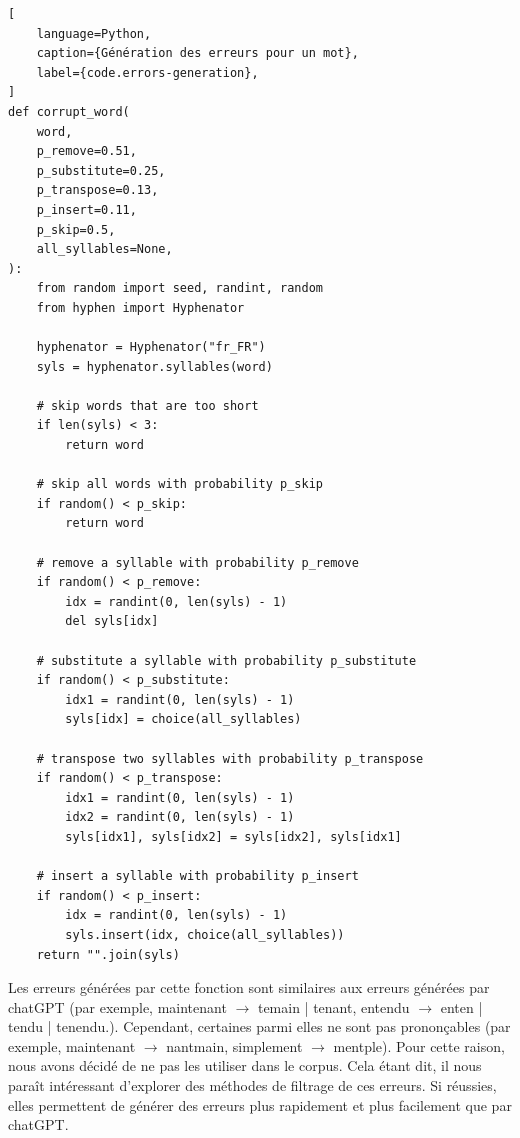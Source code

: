 \begin{lstlisting}[
    language=Python,
    caption={Génération des erreurs pour un mot},
    label={code.errors-generation},
]
def corrupt_word(
    word,
    p_remove=0.51,
    p_substitute=0.25,
    p_transpose=0.13,
    p_insert=0.11,
    p_skip=0.5,
    all_syllables=None,
):
    from random import seed, randint, random
    from hyphen import Hyphenator

    hyphenator = Hyphenator("fr_FR")
    syls = hyphenator.syllables(word)

    # skip words that are too short
    if len(syls) < 3:
        return word

    # skip all words with probability p_skip
    if random() < p_skip:
        return word

    # remove a syllable with probability p_remove
    if random() < p_remove:
        idx = randint(0, len(syls) - 1)
        del syls[idx]

    # substitute a syllable with probability p_substitute
    if random() < p_substitute:
        idx1 = randint(0, len(syls) - 1)
        syls[idx] = choice(all_syllables)

    # transpose two syllables with probability p_transpose
    if random() < p_transpose:
        idx1 = randint(0, len(syls) - 1)
        idx2 = randint(0, len(syls) - 1)
        syls[idx1], syls[idx2] = syls[idx2], syls[idx1]

    # insert a syllable with probability p_insert
    if random() < p_insert:
        idx = randint(0, len(syls) - 1)
        syls.insert(idx, choice(all_syllables))
    return "".join(syls)
\end{lstlisting}

Les erreurs générées par cette fonction sont similaires aux erreurs générées par chatGPT
(par exemple, maintenant \(\to\) temain | tenant, entendu \(\to\) enten | tendu | tenendu.).
Cependant, certaines parmi elles ne sont pas prononçables
(par exemple, maintenant \(\to\) nantmain, simplement \(\to\) mentple).
Pour cette raison, nous avons décidé de ne pas les utiliser dans le corpus.
Cela étant dit, il nous paraît intéressant d'explorer des méthodes de filtrage de ces erreurs.
Si réussies, elles permettent de générer des erreurs plus rapidement et plus facilement que par chatGPT.